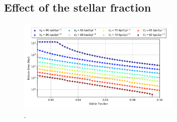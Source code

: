 	\subsection{Effect of the stellar fraction}
	\begin{figure}[h]
		\centering
		\includegraphics[width = 0.7\textwidth]{"../Files/Week 7/Symmetric/returntimes_stellar_speed"}
		\caption{.}
		\label{fig: stellarfraction}
	\end{figure}